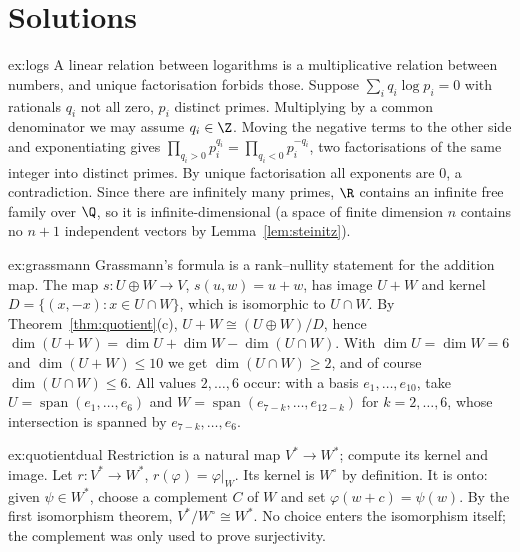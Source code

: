 \section{Solutions}

\begin{solution}{ex:logs}
\idea A linear relation between logarithms is a multiplicative relation between numbers, and unique factorisation
forbids those.
\writeup Suppose $\sum_i q_i\log p_i=0$ with rationals $q_i$ not all zero, $p_i$ distinct primes. Multiplying by a common
denominator we may assume $q_i\in\Z$. Moving the negative terms to the other side and exponentiating gives
$\prod_{q_i>0}p_i^{q_i}=\prod_{q_i<0}p_i^{-q_i}$, two factorisations of the same integer into distinct primes. By unique
factorisation all exponents are $0$, a contradiction. Since there are infinitely many primes, $\R$ contains an infinite
free family over $\Q$, so it is infinite-dimensional (a space of finite dimension $n$ contains no $n+1$ independent
vectors by Lemma~\ref{lem:steinitz}).
\end{solution}

\begin{solution}{ex:grassmann}
\idea Grassmann's formula is a rank--nullity statement for the addition map.
\writeup The map $s:U\oplus W\to V$, $s(u,w)=u+w$, has image $U+W$ and kernel $D=\{(x,-x):x\in U\cap W\}$, which is
isomorphic to $U\cap W$. By Theorem~\ref{thm:quotient}(c), $U+W\cong(U\oplus W)/D$, hence
$\dim(U+W)=\dim U+\dim W-\dim(U\cap W)$. With $\dim U=\dim W=6$ and $\dim(U+W)\le10$ we get $\dim(U\cap W)\ge2$, and of
course $\dim(U\cap W)\le6$. All values $2,\dots,6$ occur: with a basis $e_1,\dots,e_{10}$, take $U=\operatorname{span}(e_1,\dots,e_6)$
and $W=\operatorname{span}(e_{7-k},\dots,e_{12-k})$ for $k=2,\dots,6$, whose intersection is spanned by $e_{7-k},\dots,e_6$.
\end{solution}

\begin{solution}{ex:quotientdual}
\idea Restriction is a natural map $V^*\to W^*$; compute its kernel and image.
\writeup Let $r:V^*\to W^*$, $r(\varphi)=\varphi|_W$. Its kernel is $W^\circ$ by definition. It is onto: given $\psi\in W^*$,
choose a complement $C$ of $W$ and set $\varphi(w+c)=\psi(w)$. By the first isomorphism theorem, $V^*/W^\circ\cong W^*$. No
choice enters the isomorphism itself; the complement was only used to prove surjectivity.
\end{solution}

